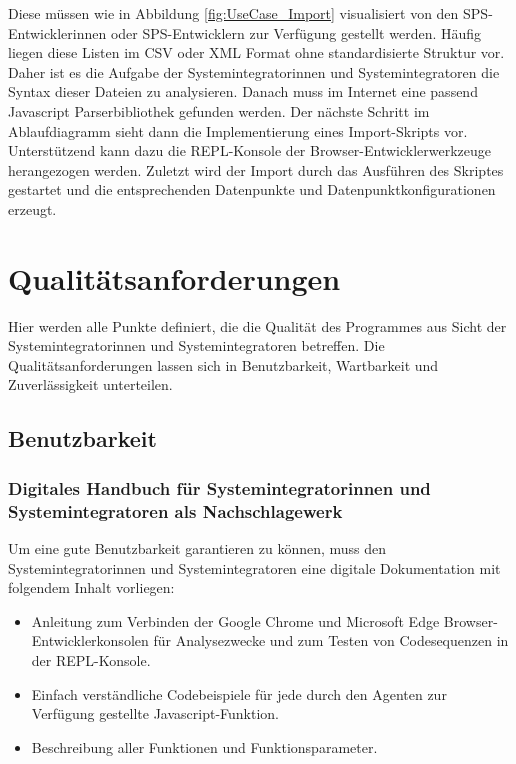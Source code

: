 Diese müssen wie in Abbildung \ref{fig:UseCase_Import} visualisiert von den SPS-Entwicklerinnen oder SPS-Entwicklern zur Verfügung gestellt werden. 
Häufig liegen diese Listen im CSV oder XML Format ohne standardisierte Struktur vor. Daher ist es die Aufgabe der Systemintegratorinnen und Systemintegratoren die Syntax dieser Dateien zu analysieren.
Danach muss im Internet eine passend Javascript Parserbibliothek gefunden werden. Der nächste Schritt im Ablaufdiagramm sieht dann die Implementierung eines Import-Skripts vor. Unterstützend kann dazu die REPL-Konsole der Browser-Entwicklerwerkzeuge herangezogen werden. Zuletzt wird der Import durch das Ausführen des Skriptes gestartet
und die entsprechenden Datenpunkte und Datenpunktkonfigurationen erzeugt.

\section{Qualitätsanforderungen}

Hier werden alle Punkte definiert, die die Qualität des Programmes aus Sicht der Systemintegratorinnen und Systemintegratoren betreffen.
Die Qualitätsanforderungen lassen sich in Benutzbarkeit, Wartbarkeit und Zuverlässigkeit unterteilen.

\subsection{Benutzbarkeit}

\subsubsection{Digitales Handbuch für Systemintegratorinnen und Systemintegratoren als Nachschlagewerk}

Um eine gute Benutzbarkeit garantieren zu können, muss den Systemintegratorinnen und Systemintegratoren eine digitale Dokumentation mit folgendem
Inhalt vorliegen:

\begin{itemize}
	\item Anleitung zum Verbinden der Google Chrome und Microsoft Edge Browser-\\Entwicklerkonsolen für Analysezwecke und zum Testen von Codesequenzen in der REPL-Konsole.
	\item Einfach verständliche Codebeispiele für jede durch den Agenten zur Verfügung gestellte Javascript-Funktion.
	\item Beschreibung aller Funktionen und Funktionsparameter. 
\end{itemize}


